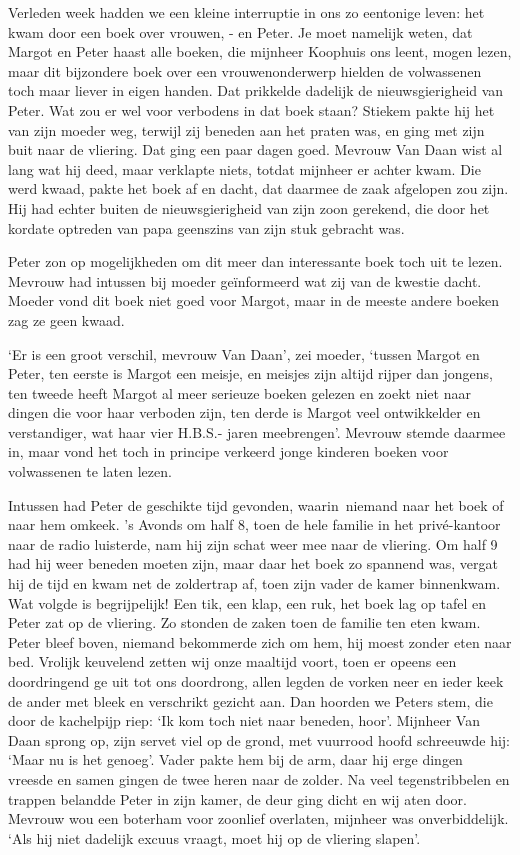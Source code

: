 \documentclass{book}
\begin{document}
Verleden week hadden we een kleine interruptie in ons zo eentonige leven: het
kwam door een boek over vrouwen, - en Peter. Je moet namelijk weten, dat Margot
en Peter haast alle boeken, die mijnheer Koophuis ons leent, mogen lezen, maar
dit bijzondere boek over een vrouwenonderwerp hielden de volwassenen toch maar
liever in eigen handen. Dat prikkelde dadelijk de nieuwsgierigheid van Peter.
Wat zou er wel voor verbodens in dat boek staan? Stiekem pakte hij het van zijn
moeder weg, terwijl zij beneden aan het praten was, en ging met zijn buit naar
de vliering. Dat ging een paar dagen goed. Mevrouw Van Daan wist al lang wat hij
deed, maar verklapte niets, totdat mijnheer er achter kwam. Die werd kwaad,
pakte het boek af en dacht, dat daarmee de zaak afgelopen zou zijn. Hij had
echter buiten de nieuwsgierigheid van zijn zoon gerekend, die door het kordate
optreden van papa geenszins van zijn stuk gebracht was.

Peter zon op mogelijkheden om dit meer dan interessante boek toch uit te lezen.
Mevrouw had intussen bij moeder geïnformeerd wat zij van de kwestie dacht.
Moeder vond dit boek niet goed voor Margot, maar in de meeste andere boeken zag
ze geen kwaad.

`Er is een groot verschil, mevrouw Van Daan', zei moeder, `tussen Margot en
Peter, ten eerste is Margot een meisje, en meisjes zijn altijd rijper dan
jongens, ten tweede heeft Margot al meer serieuze boeken gelezen en zoekt niet
naar dingen die voor haar verboden zijn, ten derde is Margot veel ontwikkelder
en verstandiger, wat haar vier H.B.S.- jaren meebrengen'. Mevrouw stemde daarmee
in, maar vond het toch in principe verkeerd jonge kinderen boeken voor
volwassenen te laten lezen.

Intussen had Peter de geschikte tijd gevonden, waarin~niemand naar het boek of
naar hem omkeek. 's Avonds om half 8, toen de hele familie in het privé-kantoor
naar de radio luisterde, nam hij zijn schat weer mee naar de vliering. Om half 9
had hij weer beneden moeten zijn, maar daar het boek zo spannend was, vergat hij
de tijd en kwam net de zoldertrap af, toen zijn vader de kamer binnenkwam. Wat
volgde is begrijpelijk! Een tik, een klap, een ruk, het boek lag op tafel en
Peter zat op de vliering. Zo stonden de zaken toen de familie ten eten kwam.
Peter bleef boven, niemand bekommerde zich om hem, hij moest zonder eten naar
bed.  Vrolijk keuvelend zetten wij onze maaltijd voort, toen er opeens een
doordringend ge uit tot ons doordrong, allen legden de vorken neer en ieder keek
de ander met bleek en verschrikt gezicht aan. Dan hoorden we Peters stem, die
door de kachelpijp riep: `Ik kom toch niet naar beneden, hoor'. Mijnheer Van
Daan sprong op, zijn servet viel op de grond, met vuurrood hoofd schreeuwde hij:
`Maar nu is het genoeg'. Vader pakte hem bij de arm, daar hij erge dingen
vreesde en samen gingen de twee heren naar de zolder. Na veel tegenstribbelen en
trappen belandde Peter in zijn kamer, de deur ging dicht en wij aten door.
Mevrouw wou een boterham voor zoonlief overlaten, mijnheer was onverbiddelijk.
`Als hij niet dadelijk excuus vraagt, moet hij op de vliering slapen'.
\end{document}
